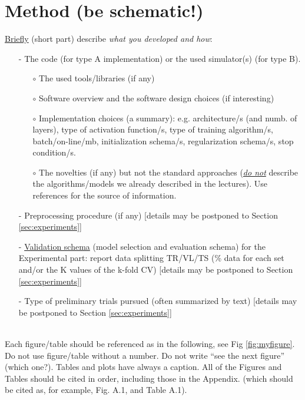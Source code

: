 \documentclass[11pt, letterpaper]{article}  %
\begin{document}
\section{Method (be schematic!)}
\underline{Briefly} (short part) describe \textit{what you developed and how}:
\begin{itemize}
    \setlength\itemsep{0em}
    \item[-] The code (for type A implementation) or the used simulator(s) (for type B). 
        \begin{itemize}
            \setlength\itemsep{0em}
            \item[$\circ$] The used tools/libraries (if any) 
            \item[$\circ$] Software overview and the software design choices (if interesting)
            \item[$\circ$] Implementation choices (a summary): e.g. architecture/s (and numb. of layers), type of activation function/s, type of training algorithm/s, batch/on-line/mb, initialization schema/s, regularization schema/s, stop condition/s.
            \item[$\circ$] The novelties (if any) but not the standard approaches (\underline{\textit{do not}} describe the algorithms/models we already described in the lectures). Use references for the source of information. 
        \end{itemize}
        \item[-] Preprocessing procedure (if any) [details may be postponed to Section \ref{sec:experiments}]
        \item[-] \underline{Validation schema} (model selection and evaluation schema) for the Experimental part: report data splitting  TR/VL/TS (\% data for each set and/or the K values of the k-fold CV) [details may be postponed to Section \ref{sec:experiments}]
        \item[-] Type of preliminary trials pursued (often summarized by text) [details may be postponed to Section \ref{sec:experiments}]
\end{itemize}


\noindent \\ Each figure/table should be referenced as in the following, see Fig \ref{fig:myfigure}. 
Do not use figure/table without a number. Do not write “see the next figure” (which one?).
Tables and plots have always a caption. All of the Figures and Tables should be cited in order, including those in the Appendix. (which should be cited as, for example, Fig. A.1, and Table A.1).  
\end{document}
